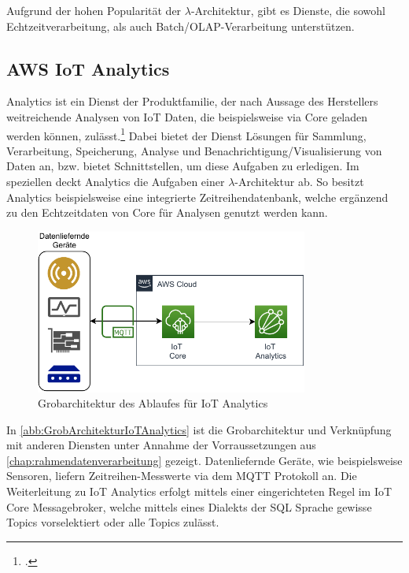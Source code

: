 Aufgrund der hohen Popularität der $\lambda$-Architektur, gibt es Dienste, die sowohl Echtzeitverarbeitung, als auch Batch/\ac{OLAP}-Verarbeitung unterstützen.

\subsection{AWS IoT Analytics} \label{productselection:iotanalytics}



\AWSIOT Analytics ist ein Dienst der \AWSIOT Produktfamilie, der nach Aussage des Herstellers weitreichende Analysen von \ac{IoT} Daten, die beispielsweise via \AWSIOT Core geladen werden können, zulässt.\footcite[Vgl. auch im Folgenden][]{AmazonWebServicesInc..o.J.c} Dabei bietet der Dienst Lösungen für Sammlung, Verarbeitung, Speicherung, Analyse und Benachrichtigung/Visualisierung von Daten an, bzw. bietet Schnittstellen, um diese Aufgaben zu erledigen. Im speziellen deckt \AWSIOT Analytics die Aufgaben einer $\lambda$-Architektur ab. So besitzt \AWSIOT Analytics beispielsweise eine integrierte Zeitreihendatenbank, welche ergänzend zu den Echtzeitdaten von \AWSIOT Core für Analysen genutzt werden kann.
\begin{figure}[H]
\centering
\includegraphics[width=0.8\textwidth]{graphics/IoT-Analytics-general.pdf}
\caption{Grobarchitektur des Ablaufes für IoT Analytics}
\label{abb:GrobArchitekturIoTAnalytics}
\end{figure}
In \autoref{abb:GrobArchitekturIoTAnalytics} ist die Grobarchitektur und Verknüpfung mit anderen Diensten unter Annahme der Vorraussetzungen aus \autoref{chap:rahmendatenverarbeitung} gezeigt. Datenliefernde Geräte, wie beispielsweise Sensoren, liefern Zeitreihen-Messwerte via dem \ac{MQTT} Protokoll an. Die Weiterleitung zu IoT Analytics erfolgt mittels einer eingerichteten Regel im \ac{IoT} Core Messagebroker, welche mittels eines Dialekts der \ac{SQL} Sprache gewisse Topics vorselektiert oder alle Topics zulässt.


